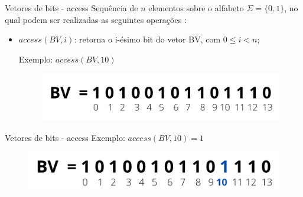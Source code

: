 \begin{frame}{Vetores de bits - access}
    Sequência de $n$ elementos sobre o alfabeto $\Sigma = \{0,1\}$, no qual podem ser realizadas as seguintes operações \citep{book-compact-data-structures}:
        \vspace{0.5cm}
        \begin{itemize}
            \item $access(BV,i)$: retorna o i-ésimo bit do vetor BV, com $0 \leq i < n$;
            \vspace{0.5cm}
            
            Exemplo: $access(BV,10)$
            
            \begin{figure}[h!]
                \centering
                \includegraphics[scale=0.5]{images/bitvector.png}
            \end{figure} 
        \end{itemize}
    \end{frame}
    
    \begin{frame}{Vetores de bits - access}
        Exemplo: $access(BV,10)=1$
        \begin{figure}[h!]
            \centering
            \includegraphics[scale=0.7]{images/access-res.png}
        \end{figure} 
    \end{frame}
    
